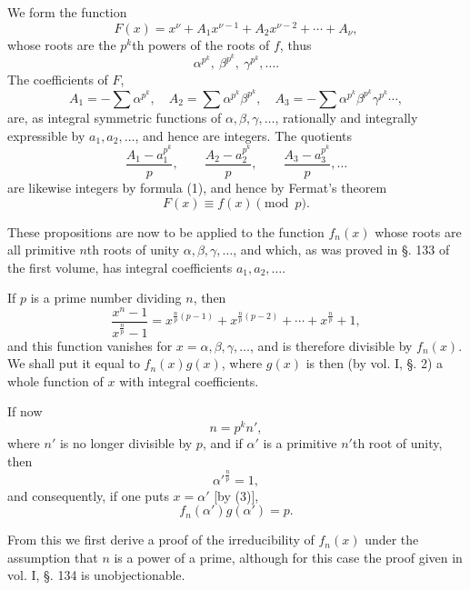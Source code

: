 \documentclass[11pt]{article}
\begin{document}
We form the function
\[
F(x)=x^\nu+A_1x^{\nu-1}+A_2x^{\nu-2}+\cdots+A_\nu,
\]
whose roots are the $p^k$th powers of the roots of $f$, thus
\[
\alpha^{p^k},\ \beta^{p^k},\ \gamma^{p^k},\ldots .
\]
The coefficients of $F$,
\[
A_1=-\sum\alpha^{p^k},\quad
A_2=\sum\alpha^{p^k}\beta^{p^k},\quad
A_3=-\sum\alpha^{p^k}\beta^{p^k}\gamma^{p^k}\cdots,
\]
are, as integral symmetric functions of $\alpha,\beta,\gamma,\ldots$, rationally and integrally expressible by $a_1,a_2,\ldots$, and hence are integers. The quotients
\[
\frac{A_1-a_1^{p^k}}{p},\qquad
\frac{A_2-a_2^{p^k}}{p},\qquad
\frac{A_3-a_3^{p^k}}{p},\ldots
\]
are likewise integers by formula (1), and hence by Fermat's theorem
\begin{equation}\tag{2}
F(x)\equiv f(x) \pmod p.
\end{equation}

These propositions are now to be applied to the function $f_n(x)$ whose roots are all primitive $n$th roots of unity $\alpha,\beta,\gamma,\ldots$,
 and which, as was proved in §. 133 of the first volume, has integral coefficients $a_1,a_2,\ldots$.

If $p$ is a prime number dividing $n$, then
\begin{equation}\tag{3}
\frac{x^n-1}{x^{\frac np}-1}
=x^{\frac np(p-1)}+x^{\frac np(p-2)}+\cdots+x^{\frac np}+1,
\end{equation}
and this function vanishes for $x=\alpha,\beta,\gamma,\ldots$, and is therefore divisible by $f_n(x)$. We shall put it equal to $f_n(x)g(x)$, where $g(x)$ is then (by vol. I, §. 2) a whole function of $x$ with integral coefficients.

If now
\[
n=p^k n',
\]
where $n'$ is no longer divisible by $p$, and if $\alpha'$ is a primitive $n'$th root of unity, then
\[
\alpha'^{\frac np}=1,
\]
and consequently, if one puts $x=\alpha'$ [by (3)],
\begin{equation}\tag{4}
f_n(\alpha')g(\alpha')=p.
\end{equation}

From this we first derive a proof of the irreducibility of $f_n(x)$ under the assumption that $n$ is a power of a prime, although for this case the proof given in vol. I, §. 134 is unobjectionable.
\end{document}
